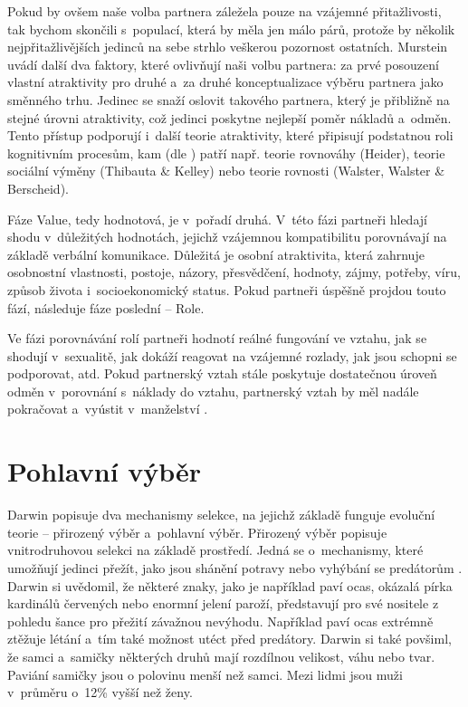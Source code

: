 \documentclass[a4paper, 12pt, notitlepage, oneside, numbers=noenddot]{report}
\begin{document}
Pokud by ovšem naše volba partnera záležela pouze na vzájemné
přitažlivosti, tak bychom skončili s~populací, která by měla jen málo
párů, protože by několik nejpřitažlivějších jedinců na sebe strhlo
veškerou pozornost ostatních.  Murstein uvádí další dva faktory, které
ovlivňují naši volbu partnera: za prvé posouzení vlastní
at\-rak\-ti\-vi\-ty pro druhé a~za druhé konceptualizace výběru
partnera jako směnného trhu. Jedinec se snaží oslovit takového
partnera, který je přibližně na stejné úrovni atraktivity, což jedinci
poskytne nejlepší poměr nákladů a~odměn. Tento přístup podporují
i~další teorie atraktivity, které připisují podstatnou roli
kognitivním procesům, kam (dle \citealp{Slamenik2008}) patří
např. teorie rovnováhy (Heider), teorie sociální výměny (Thibauta \&
Kelley) nebo teorie rovnosti (Walster, Walster \& Berscheid).

Fáze Value, tedy hodnotová, je v~pořadí druhá.  V~této fázi partneři
hledají shodu v~dů\-le\-ži\-tých hodnotách, jejichž vzájemnou
kompatibilitu porovnávají na základě verbální komunikace.  Důležitá je
osobní atraktivita, která zahrnuje osobnostní vlastnosti, postoje,
názory, přesvědčení, hodnoty, zájmy, potřeby, víru, způsob života
i~socioekonomický status.  Pokud partneři úspěšně projdou touto fází,
následuje fáze poslední -- Role.

Ve fázi porovnávání rolí partneři hodnotí reálné fungování ve vztahu,
jak se shodují v~sexualitě, jak dokáží reagovat na vzájemné rozlady,
jak jsou schopni se podporovat, atd.  Pokud partnerský vztah stále
poskytuje dostatečnou úroveň odměn v~porovnání s~náklady do vztahu,
partnerský vztah by měl nadále pokračovat a~vyústit v~manželství
\citep{Murstein1970}.

\section{Pohlavní výběr}
Darwin popisuje dva mechanismy selekce, na jejichž základě funguje
evoluční teorie -- přirozený výběr a~pohlavní výběr.  Přirozený výběr
popisuje vnitrodruhovou selekci na základě prostředí.  Jedná se
o~mechanismy, které umožňují jedinci přežít, jako jsou shánění potravy
nebo vyhýbání se predátorům \citep{Darwin2005, Buss2007}.  Darwin si
uvědomil, že některé znaky, jako je například paví ocas, okázalá pírka
kardinálů červených nebo enormní jelení paroží, představují pro své
nositele z pohledu šance pro přežití závažnou nevýhodu.  Například
paví ocas extrémně ztěžuje létání a~tím také možnost utéct před
predátory.  Darwin si také povšiml, že samci a~samičky některých druhů
mají rozdílnou velikost, váhu nebo tvar.  Paviání samičky jsou o
polovinu menší než samci.  Mezi lidmi jsou muži v~průměru o~12\% vyšší
než ženy.
\end{document}
